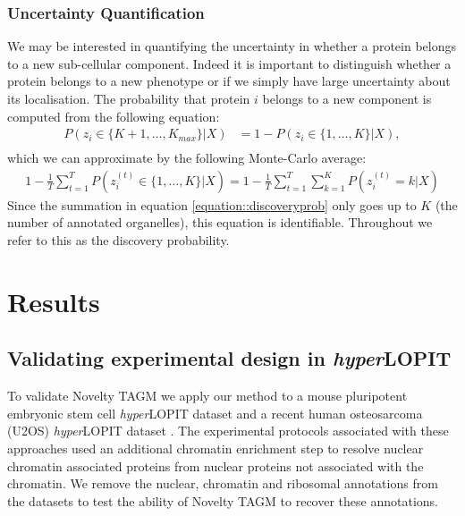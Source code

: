 \documentclass[12pt,english]{article}
\begin{document}
\subsubsection{Uncertainty Quantification}
We may be interested in quantifying the uncertainty in whether a protein belongs to a new sub-cellular component. Indeed it is important to distinguish whether a protein belongs to a new phenotype or if we simply have large uncertainty about its localisation. The probability that protein $i$ belongs to a new component is computed from the following equation:
\begin{align}
P(z_i \in \{K + 1,..., K_{max}\}|X) & = 1 - P(z_i \in \{1,..., K\}|X), \\ 
\end{align}
which we can approximate by the following Monte-Carlo average:
\begin{align}\label{equation::discoveryprob}
1 - \frac{1}{T} \sum_{t = 1}^{T}P(z^{(t)}_i \in \{1,..., K\}|X)= 1 - \frac{1}{T} \sum_{t = 1}^{T} \sum_{k=1}^KP(z^{(t)}_i = k|X)
\end{align}
Since the summation in equation \ref{equation::discoveryprob} only goes up to $K$ (the number of annotated organelles), this equation is identifiable. Throughout we refer to this as the discovery probability.
\clearpage
\section{Results}
\subsection{Validating experimental design in \textit{hyper}LOPIT}
To validate Novelty TAGM we apply our method to a mouse pluripotent embryonic stem cell \textit{hyper}LOPIT dataset \citep{hyper} and a recent human osteosarcoma (U2OS) \textit{hyper}LOPIT dataset \citep{Thul:2017, DC:2018}. The experimental protocols associated with these approaches used an additional chromatin enrichment step to resolve nuclear chromatin associated proteins from nuclear proteins not associated with the chromatin. We remove the nuclear, chromatin and ribosomal annotations from the datasets to test the ability of Novelty TAGM to recover these annotations.
\end{document}
